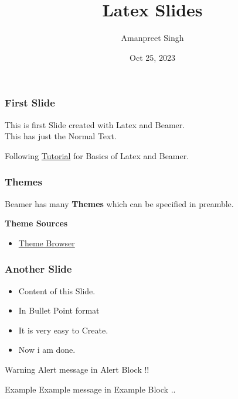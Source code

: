 \documentclass{beamer}
\title{Latex Slides}
\author{Amanpreet Singh}
\date{Oct 25, 2023}
\begin{document}
\maketitle

\begin{frame}
\frametitle{First Slide}
This is first Slide created with Latex and Beamer.\\
This has just the Normal Text.

Following \href{https://latex-beamer.com/tutorials/beamer-themes/}{Tutorial} for Basics of Latex and Beamer.
\end{frame}

\begin{frame}
\frametitle{Themes}
Beamer has many \textbf{Themes} which can be specified in preamble.

\textbf{Theme Sources}
\begin{itemize}
    \item \href{https://deic.uab.cat/~iblanes/beamer_gallery/index_by_theme.html}{Theme Browser}
\end{itemize}

\end{frame}

\begin{frame}
    \frametitle{Another Slide}
    \begin{itemize}
        \item Content of this Slide.
        \item In Bullet Point format
        \item It is very easy to Create.
        \item Now i am done.
    \end{itemize}

    \begin{alertblock}{Warning}
        Alert message in Alert Block !!
    \end{alertblock}

    \begin{exampleblock}{Example}
        Example message in Example Block ..
    \end{exampleblock}

\end{frame}
\end{document}
